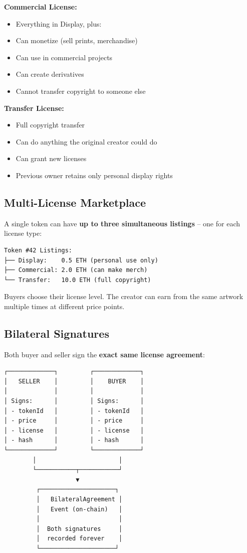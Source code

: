 \documentclass[11pt,a4paper]{article}
\begin{document}
\textbf{Commercial License:}
\begin{itemize}
    \item Everything in Display, plus:
    \item Can monetize (sell prints, merchandise)
    \item Can use in commercial projects
    \item Can create derivatives
    \item Cannot transfer copyright to someone else
\end{itemize}

\textbf{Transfer License:}
\begin{itemize}
    \item Full copyright transfer
    \item Can do anything the original creator could do
    \item Can grant new licenses
    \item Previous owner retains only personal display rights
\end{itemize}

\subsection{Multi-License Marketplace}

A single token can have \textbf{up to three simultaneous listings} -- one for each license type:

\begin{mdframed}[style=codeblock]
\begin{verbatim}
Token #42 Listings:
├── Display:    0.5 ETH (personal use only)
├── Commercial: 2.0 ETH (can make merch)
└── Transfer:   10.0 ETH (full copyright)
\end{verbatim}
\end{mdframed}

Buyers choose their license level. The creator can earn from the same artwork multiple times at different price points.

\subsection{Bilateral Signatures}

Both buyer and seller sign the \textbf{exact same license agreement}:

\begin{mdframed}[style=codeblock]
\begin{verbatim}
┌─────────────┐         ┌─────────────┐
│   SELLER    │         │    BUYER    │
│             │         │             │
│ Signs:      │         │ Signs:      │
│ - tokenId   │         │ - tokenId   │
│ - price     │         │ - price     │
│ - license   │         │ - license   │
│ - hash      │         │ - hash      │
└─────────────┘         └─────────────┘
        │                       │
        └───────────┬───────────┘
                    ▼
         ┌─────────────────────┐
         │   BilateralAgreement │
         │   Event (on-chain)   │
         │                      │
         │  Both signatures     │
         │  recorded forever    │
         └─────────────────────┘
\end{verbatim}
\end{mdframed}
\end{document}
